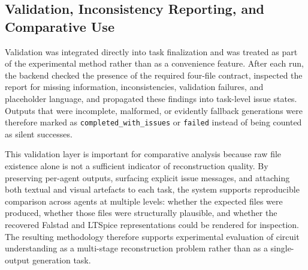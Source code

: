 \subsection{Validation, Inconsistency Reporting, and Comparative Use}

Validation was integrated directly into task finalization and was treated as part of the experimental method rather than as a convenience feature. After each run, the backend checked the presence of the required four-file contract, inspected the report for missing information, inconsistencies, validation failures, and placeholder language, and propagated these findings into task-level issue states. Outputs that were incomplete, malformed, or evidently fallback generations were therefore marked as \texttt{completed\_with\_issues} or \texttt{failed} instead of being counted as silent successes.

This validation layer is important for comparative analysis because raw file existence alone is not a sufficient indicator of reconstruction quality. By preserving per-agent outputs, surfacing explicit issue messages, and attaching both textual and visual artefacts to each task, the system supports reproducible comparison across agents at multiple levels: whether the expected files were produced, whether those files were structurally plausible, and whether the recovered Falstad and LTSpice representations could be rendered for inspection. The resulting methodology therefore supports experimental evaluation of circuit understanding as a multi-stage reconstruction problem rather than as a single-output generation task.
